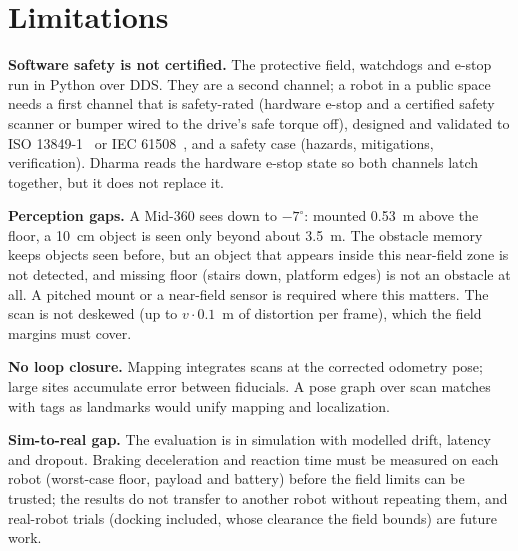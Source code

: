 \section{Limitations}
\label{sec:limits}

\textbf{Software safety is not certified.} The protective field, watchdogs and e-stop run in
Python over DDS. They are a second channel; a robot in a public space needs a first channel
that is safety-rated (hardware e-stop and a certified safety scanner or bumper wired to the
drive's safe torque off), designed and validated to ISO 13849-1~\cite{iso13849} or IEC
61508~\cite{iec61508}, and a safety case (hazards, mitigations, verification). Dharma reads the
hardware e-stop state so both channels latch together, but it does not replace it.

\textbf{Perception gaps.} A Mid-360 sees down to $-7^\circ$: mounted 0.53~m above the floor, a
10~cm object is seen only beyond about 3.5~m. The obstacle memory keeps objects seen before, but
an object that appears inside this near-field zone is not detected, and missing floor (stairs
down, platform edges) is not an obstacle at all. A pitched mount or a near-field sensor is
required where this matters. The scan is not deskewed (up to $v \cdot 0.1$~m of distortion per
frame), which the field margins must cover.

\textbf{No loop closure.} Mapping integrates scans at the corrected odometry pose; large sites
accumulate error between fiducials. A pose graph over scan matches with tags as landmarks would
unify mapping and localization.

\textbf{Sim-to-real gap.} The evaluation is in simulation with modelled drift, latency and
dropout. Braking deceleration and reaction time must be measured on each robot (worst-case
floor, payload and battery) before the field limits can be trusted; the results do not
transfer to another robot without repeating them, and real-robot trials (docking included,
whose clearance the field bounds) are future work.
